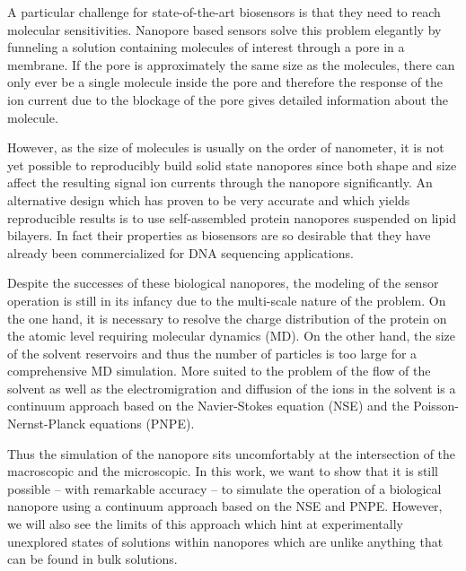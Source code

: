 \documentclass[journal=ancac3,manuscript=article,etalmode=truncate,maxauthors=0,layout=twocolumn]{achemso}
\begin{document}
A particular challenge for state-of-the-art biosensors is that they need to reach molecular sensitivities.  
Nanopore based sensors solve this problem elegantly by funneling a solution containing molecules of interest 
through a pore in a membrane. If the pore is approximately the same size as the molecules, there can only 
ever be a single molecule inside the pore and therefore the response of the ion current due to the blockage 
of the pore gives detailed information about the molecule.

However, as the size of molecules is usually on the order of nanometer, it is not yet possible to reproducibly
build solid state nanopores since both shape and size affect the resulting signal ion currents 
through the nanopore significantly. An alternative design which has proven to be very accurate and which 
yields reproducible results is to use self-assembled protein nanopores suspended on lipid 
bilayers\cite{Deamer-2016}.
In fact their properties as biosensors are so desirable that they have already been commercialized for DNA
sequencing applications.



Despite the successes of these biological nanopores, the modeling of the sensor operation is still in its 
infancy due to the multi-scale nature of the problem. On the one hand, it is necessary to resolve the charge 
distribution of the protein on the atomic level requiring molecular dynamics (MD).  On the other 
hand, the size of the solvent reservoirs and thus the number of particles is too large for a comprehensive MD 
simulation. More suited to the problem of the flow of the solvent as well as the electromigration and 
diffusion of the ions in the solvent is a continuum approach based on the Navier-Stokes equation (NSE) and 
the Poisson-Nernst-Planck equations (PNPE).

Thus the simulation of the nanopore sits uncomfortably at the intersection of the macroscopic and the
microscopic. In this work, we want to show that it is still possible -- with remarkable accuracy -- to 
simulate the operation of a biological nanopore using a continuum approach based on the NSE and PNPE. 
However, we will also see the limits of this approach which hint at experimentally unexplored states of
solutions within nanopores which are unlike anything that can be found in bulk solutions.
\end{document}
